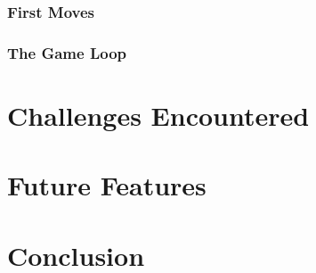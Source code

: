 \documentclass[pageno]{jpaper}
\begin{document}
\begin{doublespacing}
\hypertarget{sec:first_moves}{}
\subsubsection{First Moves}

\hypertarget{sec:the_game_loop}{}
\subsubsection{The Game Loop}

\hypertarget{sec:challenges_encountered}{}
\section{Challenges Encountered}



\hypertarget{sec:future_features}{}
\section{Future Features}


\hypertarget{sec:conclusion}{}
\section{Conclusion}

\end{doublespacing} 


\end{document}
